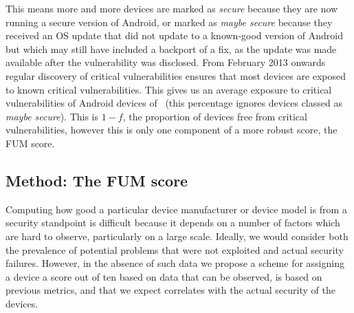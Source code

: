 This means more and more devices are marked as \emph{secure} because they are now running a secure version of Android, or marked as \emph{maybe secure} because they received an OS update that did not update to a known-good version of Android but which may still have included a backport of a fix, as the update was made available after the vulnerability was disclosed.
From February 2013 onwards regular discovery of critical vulnerabilities ensures that most devices are exposed to known critical vulnerabilities.
This gives us an average exposure to critical vulnerabilities of Android devices of \daMeanInsecurityPerc\ (this percentage ignores devices classed as \emph{maybe secure}).
This is $1 - f$, the proportion of devices free from critical vulnerabilities, however this is only one component of a more robust score, the FUM score.

\subsection{Method: The FUM score}\label{sec:security_scoring:method}

Computing how good a particular device manufacturer or device model is from a security standpoint is difficult because it depends on a number of factors which are hard to observe, particularly on a large scale.
Ideally, we would consider both the prevalence of potential problems that were not exploited and actual security failures.
However, in the absence of such data we propose a scheme for assigning a device a score out of ten based on data that can be observed, is based on previous metrics, and that we expect correlates with the actual security of the devices.

